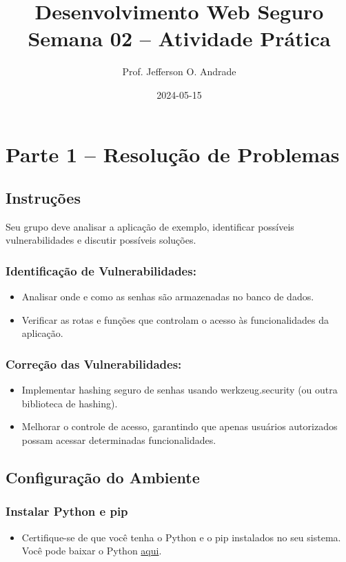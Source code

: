 \documentclass{scrartcl}
\author{Prof. Jefferson O. Andrade}
\date{2024-05-15}
\title{Desenvolvimento Web Seguro\\\medskip
\large Semana 02 -- Atividade Prática}
\begin{document}
\maketitle

\section{Parte 1 -- Resolução de Problemas}
\label{sec:orgffb1bf7}

\subsection{Instruções}
\label{sec:org3332097}

Seu grupo deve analisar a aplicação de exemplo, identificar possíveis
vulnerabilidades e discutir possíveis soluções.

\subsubsection{Identificação de Vulnerabilidades:}
\label{sec:org9024aab}
\begin{itemize}
\item Analisar onde e como as senhas são armazenadas no banco de dados.
\item Verificar as rotas e funções que controlam o acesso às funcionalidades da
aplicação.
\end{itemize}

\subsubsection{Correção das Vulnerabilidades:}
\label{sec:org5c3595d}
\begin{itemize}
\item Implementar hashing seguro de senhas usando werkzeug.security (ou outra
biblioteca de hashing).
\item Melhorar o controle de acesso, garantindo que apenas usuários autorizados
possam acessar determinadas funcionalidades.
\end{itemize}


\subsection{Configuração do Ambiente}
\label{sec:org813c669}

\subsubsection{Instalar Python e pip}
\label{sec:org1cd979d}
\begin{itemize}
\item Certifique-se de que você tenha o Python e o pip instalados no seu sistema.
Você pode baixar o Python \href{https://www.python.org/downloads/}{aqui}.
\end{itemize}
\end{document}
